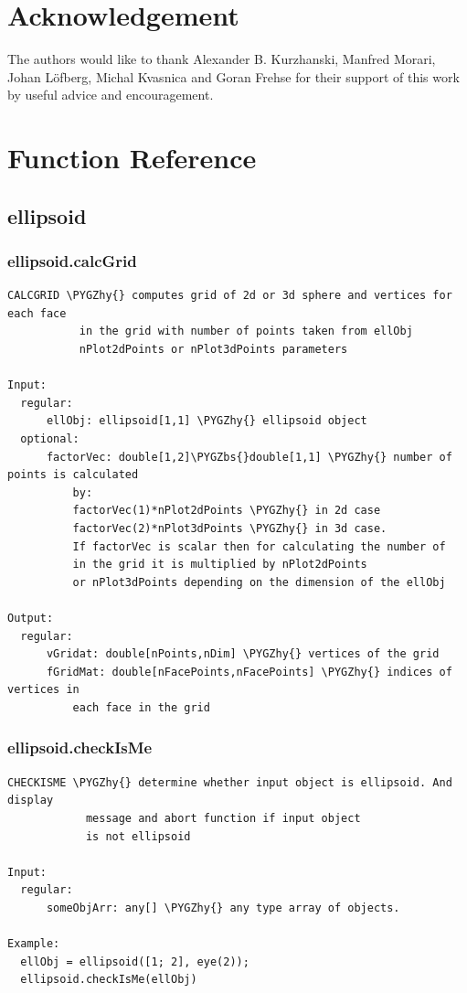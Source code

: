 \documentclass[letterpaper,10pt,english]{sphinxmanual}
\def\PYGZbs{\char`\\}
\def\PYGZhy{\char`\-}
\begin{document}
\chapter{Acknowledgement}
\label{chap_acknowledge::doc}\label{chap_acknowledge:acknowledgement}
The authors would like to thank Alexander B. Kurzhanski, Manfred Morari,
Johan Löfberg, Michal Kvasnica and Goran Frehse for their support of
this work by useful advice and encouragement.


\chapter{Function Reference}
\label{chap_functions::doc}\label{chap_functions:function-reference}

\section{ellipsoid}
\label{chap_functions:ellipsoid}

\subsection{ellipsoid.calcGrid}
\label{chap_functions:ellipsoid-calcgrid}
\begin{Verbatim}[commandchars=\\\{\}]
CALCGRID \PYGZhy{} computes grid of 2d or 3d sphere and vertices for each face
           in the grid with number of points taken from ellObj
           nPlot2dPoints or nPlot3dPoints parameters

Input:
  regular:
      ellObj: ellipsoid[1,1] \PYGZhy{} ellipsoid object
  optional:
      factorVec: double[1,2]\PYGZbs{}double[1,1] \PYGZhy{} number of points is calculated
          by:
          factorVec(1)*nPlot2dPoints \PYGZhy{} in 2d case
          factorVec(2)*nPlot3dPoints \PYGZhy{} in 3d case.
          If factorVec is scalar then for calculating the number of
          in the grid it is multiplied by nPlot2dPoints
          or nPlot3dPoints depending on the dimension of the ellObj

Output:
  regular:
      vGridat: double[nPoints,nDim] \PYGZhy{} vertices of the grid
      fGridMat: double[nFacePoints,nFacePoints] \PYGZhy{} indices of vertices in
          each face in the grid
\end{Verbatim}


\subsection{ellipsoid.checkIsMe}
\label{chap_functions:ellipsoid-checkisme}
\begin{Verbatim}[commandchars=\\\{\}]
CHECKISME \PYGZhy{} determine whether input object is ellipsoid. And display
            message and abort function if input object
            is not ellipsoid

Input:
  regular:
      someObjArr: any[] \PYGZhy{} any type array of objects.

Example:
  ellObj = ellipsoid([1; 2], eye(2));
  ellipsoid.checkIsMe(ellObj)
\end{Verbatim}
\end{document}
